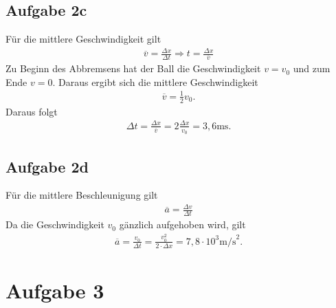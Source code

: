 \documentclass[a4paper,11pt]{article}
\begin{document}
\subsection*{Aufgabe 2c}
Für die mittlere Geschwindigkeit gilt
\begin{align*}
  \overline{v} = \frac{\Delta x}{\Delta t} \Rightarrow t = \frac{\Delta x}{\overline{v}}
\end{align*}
Zu Beginn des Abbremsens hat der Ball die Geschwindigkeit $v = v_0$ und zum Ende $v = 0$. Daraus ergibt sich die mittlere Geschwindigkeit
\begin{align*}
  \overline{v} = \frac{1}{2} v_0 \mbox{.}
\end{align*}
Daraus folgt
\begin{align*}
  \Delta t = \frac{\Delta x}{\overline{v}} = 2\frac{\Delta x}{v_0} = 3,6 \mbox{ms.}
\end{align*}

\subsection*{Aufgabe 2d}
Für die mittlere Beschleunigung gilt
\begin{align*}
  \overline{a} = \frac{\Delta v}{\Delta t}
\end{align*}
Da die Geschwindigkeit $v_0$ gänzlich aufgehoben wird, gilt
\begin{align*}
  \overline{a} = \frac{v_0}{\Delta t} = \frac{v_0^2}{2\cdot\Delta x} = 7,8\cdot 10^3 \mbox{m/s}^2\mbox{.}
\end{align*}


\section*{Aufgabe 3}
\end{document}
